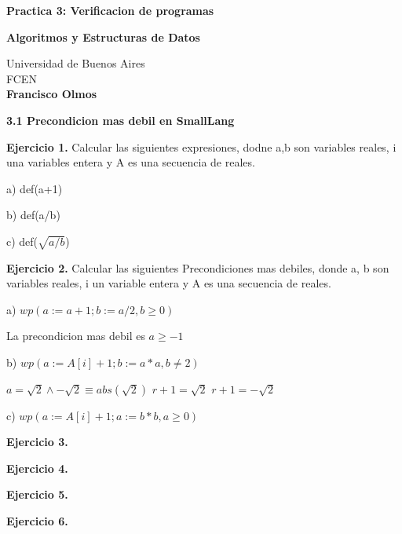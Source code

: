 \documentclass[12pt]{report}
\begin{document}
\begin{titlepage}
    \begin{center}
        \vspace*{1cm}
        
        \Huge
        \textbf{Practica 3: Verificacion de programas}
        \vspace{0.5cm}
        \LARGE

        \vfill
        \textbf{Algoritmos y Estructuras de Datos}
        

        
        \vfill

        
        \vspace{0.8cm}
        
        \Large
        Universidad de Buenos Aires \\
        FCEN \\
        \textbf{Francisco Olmos}
        
    \end{center}
\end{titlepage}


\textbf{3.1 Precondicion mas debil en SmallLang}

\vspace{0.8cm}
\textbf{Ejercicio 1.} Calcular las siguientes expresiones, dodne a,b son 
variables reales, i una variables entera y A es una secuencia de reales.
\vspace{0.8cm}

a) def(a+1)

b) def(a/b)

c) def($\sqrt{a/b}$)

\vspace{0.8cm}
\textbf{Ejercicio 2.} Calcular las siguientes Precondiciones mas debiles, donde a, b son variables reales, i un variable entera
y A es una secuencia de reales.
\vspace{0.8cm}

a) $wp(a := a+1; b:= a/2, b\geq 0)$

  La precondicion mas debil es $a\geq -1$


\vspace{0.2cm}
b) $wp(a := A[i] + 1; b:= a*a, b \neq 2)$

$a = \sqrt 2 \wedge - \sqrt 2 \equiv abs(\sqrt 2)$
$r + 1 = \sqrt 2$ 
$r + 1 = -\sqrt 2$


\vspace{0.2cm}
c) $wp(a := A[i] + 1; a:= b*b, a \geq 0)$


\vspace{0.8cm}
\textbf{Ejercicio 3.} 
\vspace{0.8cm}

\vspace{0.8cm}
\textbf{Ejercicio 4.} 
\vspace{0.8cm}

\vspace{0.8cm}
\textbf{Ejercicio 5.} 
\vspace{0.8cm}

\vspace{0.8cm}
\textbf{Ejercicio 6.} 
\vspace{0.8cm}
\end{document}

